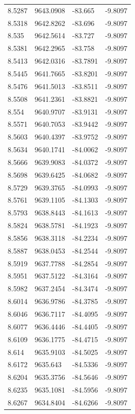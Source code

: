 \begin{table}[H]
\begin{tabular}{llll}
8.5287 & 9643.0908 & -83.665 & -9.8097 \\
8.5318 & 9642.8262 & -83.696 & -9.8097 \\
8.535 & 9642.5614 & -83.727 & -9.8097 \\
8.5381 & 9642.2965 & -83.758 & -9.8097 \\
8.5413 & 9642.0316 & -83.7891 & -9.8097 \\
8.5445 & 9641.7665 & -83.8201 & -9.8097 \\
8.5476 & 9641.5013 & -83.8511 & -9.8097 \\
8.5508 & 9641.2361 & -83.8821 & -9.8097 \\
8.554 & 9640.9707 & -83.9131 & -9.8097 \\
8.5571 & 9640.7053 & -83.9442 & -9.8097 \\
8.5603 & 9640.4397 & -83.9752 & -9.8097 \\
8.5634 & 9640.1741 & -84.0062 & -9.8097 \\
8.5666 & 9639.9083 & -84.0372 & -9.8097 \\
8.5698 & 9639.6425 & -84.0682 & -9.8097 \\
8.5729 & 9639.3765 & -84.0993 & -9.8097 \\
8.5761 & 9639.1105 & -84.1303 & -9.8097 \\
8.5793 & 9638.8443 & -84.1613 & -9.8097 \\
8.5824 & 9638.5781 & -84.1923 & -9.8097 \\
8.5856 & 9638.3118 & -84.2234 & -9.8097 \\
8.5887 & 9638.0453 & -84.2544 & -9.8097 \\
8.5919 & 9637.7788 & -84.2854 & -9.8097 \\
8.5951 & 9637.5122 & -84.3164 & -9.8097 \\
8.5982 & 9637.2454 & -84.3474 & -9.8097 \\
8.6014 & 9636.9786 & -84.3785 & -9.8097 \\
8.6046 & 9636.7117 & -84.4095 & -9.8097 \\
8.6077 & 9636.4446 & -84.4405 & -9.8097 \\
8.6109 & 9636.1775 & -84.4715 & -9.8097 \\
8.614 & 9635.9103 & -84.5025 & -9.8097 \\
8.6172 & 9635.643 & -84.5336 & -9.8097 \\
8.6204 & 9635.3756 & -84.5646 & -9.8097 \\
8.6235 & 9635.1081 & -84.5956 & -9.8097 \\
8.6267 & 9634.8404 & -84.6266 & -9.8097 \\

\end{tabular}
\end{table}
